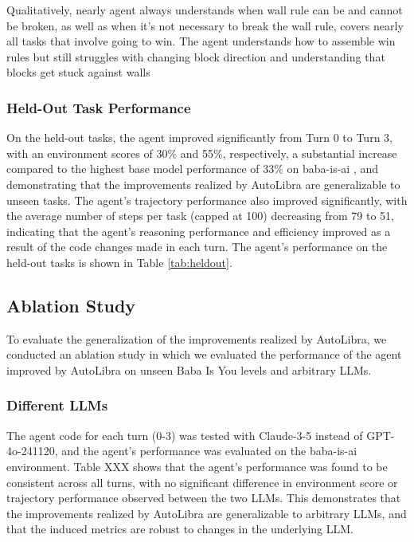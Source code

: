 Qualitatively, nearly agent always understands when wall rule can be and cannot be broken, as well as when it's not necessary to break the wall rule, covers nearly all tasks that involve going to win. The agent understands how to assemble win rules but still struggles with changing block direction and understanding that blocks get stuck against walls

\subsubsection{Held-Out Task Performance}

On the held-out tasks, the agent improved significantly from Turn 0 to Turn 3, with an environment scores of 30\% and 55\%, respectively, a substantial increase compared to the highest base model performance of 33\% on baba-is-ai \cite{paglieri2024balrog}, and demonstrating that the improvements realized by AutoLibra are generalizable to unseen tasks. The agent's trajectory performance also improved significantly, with the average number of steps per task (capped at 100) decreasing from 79 to 51, indicating that the agent's reasoning performance and efficiency improved as a result of the code changes made in each turn. The agent's performance on the held-out tasks is shown in Table \ref{tab:heldout}.


\subsection{Ablation Study}

To evaluate the generalization of the improvements realized by AutoLibra, we conducted an ablation study in which we evaluated the performance of the agent improved by AutoLibra on unseen Baba Is You levels and arbitrary LLMs.

\subsubsection{Different LLMs}

The agent code for each turn (0-3) was tested with Claude-3-5 instead of GPT-4o-241120, and the agent's performance was evaluated on the baba-is-ai environment. Table XXX shows that the agent's performance was found to be consistent across all turns, with no significant difference in environment score or trajectory performance observed between the two LLMs. This demonstrates that the improvements realized by AutoLibra are generalizable to arbitrary LLMs, and that the induced metrics are robust to changes in the underlying LLM.

